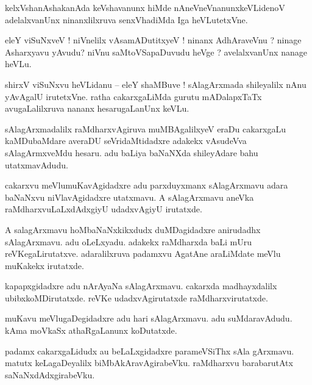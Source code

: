 \documentclass{article}
\begin{document}
\begin{mn}%
kelxVshanAshakanAda keVshavanunx hiMde nAneVneVnanunxkeVLidenoV adelalxvanUnx ninanxlilxruva 
senxVhadiMda Iga heVLutetxVne.
\end{mn}

\begin{mn}%
eleY viSuNxveV ! niVnelilx vAsamADutitxyeV ! ninanx AdhAraveVnu ? ninage Asharxyavu yAvudu? niVnu 
saMtoVSapaDuvudu heVge ? avelalxvanUnx nanage heVLu.
\end{mn}

\begin{mn}%
shirxV viSuNxvu heVLidanu -- eleY shaMBuve ! sAlagArxmada shileyalilx nAnu yAvAgalU irutetxVne. 
ratha cakarxgaLiMda gurutu mADalapxTaTx avugaLalilxruva nananx hesarugaLanUnx keVLu.
\end{mn}

\begin{mn}%
sAlagArxmadalilx raMdharxvAgiruva muMBAgalilxyeV eraDu cakarxgaLu kaMDubaMdare averaDU 
seVridaMtidadxre adakekx vAsudeVva sAlagArmxveMdu hesaru. adu baLiya baNaNXda shileyAdare bahu 
utatxmavAdudu.
\end{mn}

\begin{mn}%
cakarxvu meVlumuKavAgidadxre adu parxduyxmanx sAlagArxmavu adara baNaNxvu niVlavAgidadxre 
utatxmavu. A sAlagArxmavu aneVka raMdharxvuLaLxdAdxgiyU udadxvAgiyU irutatxde.
\end{mn}

\begin{mn}%
A salagArxmavu hoMbaNaNxkikxdudx duMDagidadxre anirudadhx sAlagArxmavu. adu oLeLxyadu. adakekx 
raMdharxda baLi mUru reVKegaLirutatxve. adaralilxruva padamxvu AgatAne araLiMdate meVlu muKakekx 
irutatxde.
\end{mn}

\begin{mn}%
kapapxgidadxre adu nArAyaNa sAlagArxmavu. cakarxda madhayxdalilx ubibxkoMDirutatxde. reVKe 
udadxvAgirutatxde raMdharxvirutatxde. 
\end{mn}

\begin{mn}%
muKavu meVlugaDegidadxre adu hari sAlagArxmavu. adu suMdaravAdudu. kAma moVkaSx athaRgaLanunx 
koDutatxde.
\end{mn}

\begin{mn}%
padamx cakarxgaLidudx au beLaLxgidadxre parameVSiThx sAla gArxmavu. matutx keLagaDeyalilx 
biMbAkAravAgirabeVku. raMdharxvu barabarutAtx saNaNxdAdxgirabeVku.
\end{mn}
\end{document}
